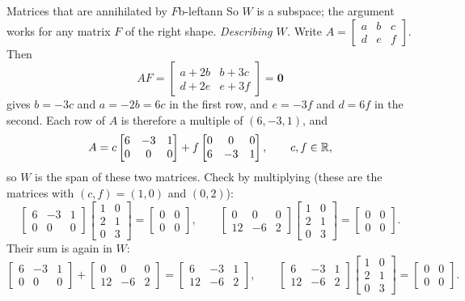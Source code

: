 \documentclass[11pt]{article}
\begin{document}
\begin{exmp}{Matrices that are annihilated by $F$}{b-leftann}
So $W$ is a subspace; the argument works for any matrix $F$ of the right shape. \emph{Describing $W$.} Write $A=\begin{bmatrix}a&b&c\\d&e&f\end{bmatrix}$. Then
\[
AF=\begin{bmatrix}a+2b&b+3c\\d+2e&e+3f\end{bmatrix}=\mathbf{0}
\]
gives $b=-3c$ and $a=-2b=6c$ in the first row, and $e=-3f$ and $d=6f$ in the second. Each row of $A$ is therefore a multiple of $(6,-3,1)$, and
\[
A=c\begin{bmatrix}6&-3&1\\0&0&0\end{bmatrix}+f\begin{bmatrix}0&0&0\\6&-3&1\end{bmatrix},\qquad c,f\in\mathbb{R},
\]
so $W$ is the span of these two matrices. Check by multiplying (these are the matrices with $(c,f)=(1,0)$ and $(0,2)$):
\[
\begin{bmatrix}6&-3&1\\0&0&0\end{bmatrix}\begin{bmatrix}1&0\\2&1\\0&3\end{bmatrix}=\begin{bmatrix}0&0\\0&0\end{bmatrix},\qquad
\begin{bmatrix}0&0&0\\12&-6&2\end{bmatrix}\begin{bmatrix}1&0\\2&1\\0&3\end{bmatrix}=\begin{bmatrix}0&0\\0&0\end{bmatrix}.
\]
Their sum is again in $W$:
\[
\begin{bmatrix}6&-3&1\\0&0&0\end{bmatrix}+\begin{bmatrix}0&0&0\\12&-6&2\end{bmatrix}=\begin{bmatrix}6&-3&1\\12&-6&2\end{bmatrix},\qquad
\begin{bmatrix}6&-3&1\\12&-6&2\end{bmatrix}\begin{bmatrix}1&0\\2&1\\0&3\end{bmatrix}=\begin{bmatrix}0&0\\0&0\end{bmatrix}.
\]
\end{exmp}
\end{document}
